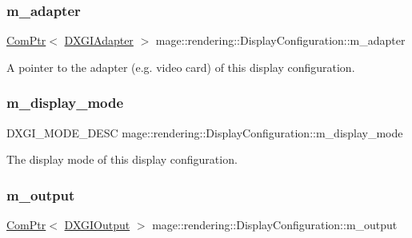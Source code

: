 \subsubsection{\texorpdfstring{m\+\_\+adapter}{m\_adapter}}
{\footnotesize\ttfamily \mbox{\hyperlink{namespacemage_ae74f374780900893caa5555d1031fd79}{Com\+Ptr}}$<$ \mbox{\hyperlink{namespacemage_1_1rendering_ad55e028ebd705b547eeb972ad8d03b6a}{D\+X\+G\+I\+Adapter}} $>$ mage\+::rendering\+::\+Display\+Configuration\+::m\+\_\+adapter\hspace{0.3cm}{\ttfamily [private]}}

A pointer to the adapter (e.\+g. video card) of this display configuration. \mbox{\label{classmage_1_1rendering_1_1_display_configuration_a577ada006ada1b1e65a8deb817f0dafe}} 
\subsubsection{\texorpdfstring{m\+\_\+display\+\_\+mode}{m\_display\_mode}}
{\footnotesize\ttfamily D\+X\+G\+I\+\_\+\+M\+O\+D\+E\+\_\+\+D\+E\+SC mage\+::rendering\+::\+Display\+Configuration\+::m\+\_\+display\+\_\+mode\hspace{0.3cm}{\ttfamily [private]}}

The display mode of this display configuration. \mbox{\label{classmage_1_1rendering_1_1_display_configuration_a3f43cbe5bb1a1a7c1bfb9ce66052fe0a}} 
\subsubsection{\texorpdfstring{m\+\_\+output}{m\_output}}
{\footnotesize\ttfamily \mbox{\hyperlink{namespacemage_ae74f374780900893caa5555d1031fd79}{Com\+Ptr}}$<$ \mbox{\hyperlink{namespacemage_1_1rendering_aaf22d3893277a4bd8497f6ea69b01532}{D\+X\+G\+I\+Output}} $>$ mage\+::rendering\+::\+Display\+Configuration\+::m\+\_\+output\hspace{0.3cm}{\ttfamily [private]}}


